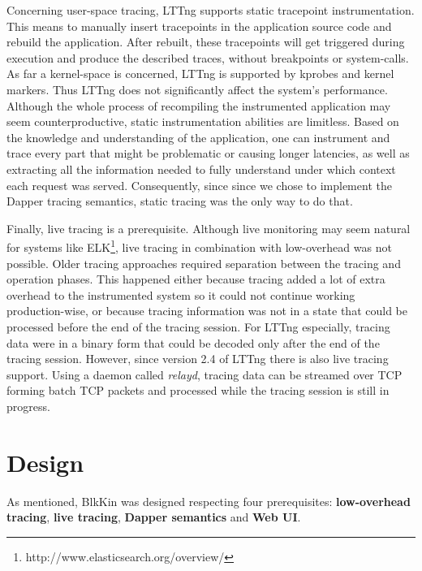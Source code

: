 \documentclass[11pt,journal,compsoc]{IEEEtran}
\begin{document}
Concerning user-space tracing, LTTng supports static tracepoint
instrumentation. This means to manually insert tracepoints in the application
source code and rebuild the application. After rebuilt, these tracepoints will
get triggered during execution and produce the described traces, without
breakpoints or system-calls. As far a kernel-space is concerned, LTTng is
supported by kprobes\cite{kprobes} and kernel markers\cite{kmarkers}. Thus
LTTng does not significantly affect the system's performance. Although the
whole process of recompiling the instrumented application may seem
counterproductive, static instrumentation abilities are limitless. Based on the
knowledge and understanding of the application, one can instrument and trace
every part that might be problematic or causing longer latencies, as well as
extracting all the information needed to fully understand under which context
each request was served. Consequently, since since we chose to implement the
Dapper tracing semantics, static tracing was the only way to do that.

Finally, live tracing is a prerequisite. Although live monitoring may seem
natural for systems like ELK\footnote{http://www.elasticsearch.org/overview/},
live tracing in combination with low-overhead was not possible. Older tracing
approaches required separation between the tracing and operation phases. This
happened either because tracing added a lot of extra overhead to the
instrumented system so it could not continue working production-wise, or
because tracing information was not in a state that could be processed before
the end of the tracing session. For LTTng especially, tracing data were in a
binary form that could be decoded only after the end of the tracing session.
However, since version 2.4 of LTTng there is also live tracing support. Using a
daemon called \emph{relayd}, tracing data can be streamed over TCP forming
batch TCP packets and processed while the tracing session is still in progress.

\section{Design}
As mentioned, BlkKin was designed respecting four prerequisites:
\textbf{low-overhead tracing}, \textbf{live tracing}, \textbf{Dapper semantics}
and \textbf{Web UI}.
\end{document}
